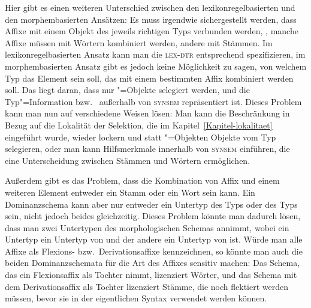 Hier gibt es einen weiteren Unterschied zwischen den lexikonregelbasierten und den morphembasierten Ansätzen:
Es muss irgendwie sichergestellt werden, dass Affixe mit einem Objekt des jeweils richtigen Typs verbunden werden,
\dash, manche Affixe müssen mit Wörtern kombiniert werden, andere mit Stämmen. 
Im lexikonregelbasierten Ansatz kann
man die \textsc{lex-dtr} entsprechend spezifizieren, im morphembasierten Ansatz gibt es jedoch keine Möglichkeit
zu sagen, von welchem Typ das Element sein soll, das mit einem bestimmten Affix kombiniert werden soll. Das liegt daran,
dass nur "=Objekte selegiert werden, und die Typ"=Information  bzw.\  außerhalb
von \textsc{synsem} repräsentiert ist. Dieses Problem kann man nun auf verschiedene Weisen lösen:
Man kann die Beschränkung in Bezug auf die Lokalität der Selektion, die im Kapitel~\ref{Kapitel-lokalitaet}
eingeführt wurde, wieder lockern und statt "=Objekten Objekte vom Typ  selegieren, oder
man kann Hilfsmerkmale innerhalb von \textsc{synsem} einführen, die eine Unterscheidung zwischen Stämmen und Wörtern
ermöglichen.

Außerdem gibt es das Problem, dass die Kombination von Affix und einem weiteren Element entweder ein
Stamm oder ein Wort sein kann. Ein Dominanzschema kann aber nur entweder ein
Untertyp des Typs  oder des Typs  sein, nicht jedoch beides
gleichzeitig. Dieses Problem könnte man dadurch lösen, dass man zwei Untertypen des morphologischen
Schemas annimmt, wobei ein Untertyp ein Untertyp von  und der andere ein Untertyp von
 ist. Würde man alle Affixe als Flexions- bzw.\ Derivationsaffixe kennzeichnen, so könnte
man auch die beiden Dominanzschemata für die Art des Affixes sensitiv machen: Das Schema, das ein
Flexionsaffix als Tochter nimmt, lizenziert Wörter, und das Schema mit dem Derivationsaffix als
Tochter lizenziert Stämme, die noch flektiert werden müssen, bevor sie in der eigentlichen Syntax
verwendet werden können.





